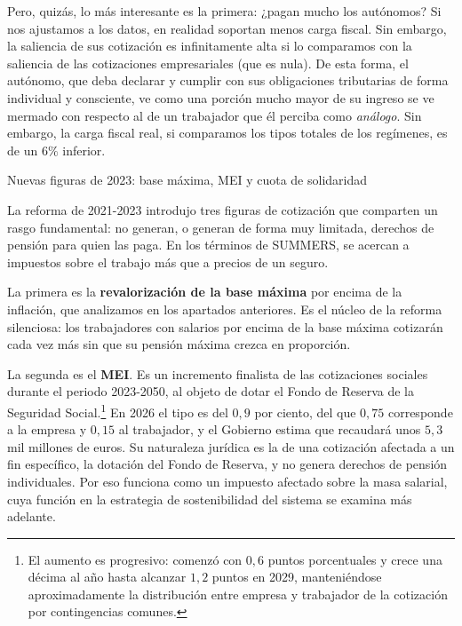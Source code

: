 \documentclass[10pt,a4paper]{article}
\begin{document}
Pero, quizás, lo más interesante es la primera: ¿pagan mucho los autónomos? Si nos ajustamos a los datos, en realidad soportan menos carga fiscal. Sin embargo, la saliencia de sus cotización es infinitamente alta si lo comparamos con la saliencia de las cotizaciones empresariales (que es nula). De esta forma, el autónomo, que deba declarar y cumplir con sus obligaciones tributarias de forma individual y consciente, ve como una porción mucho mayor de su ingreso se ve mermado con respecto al de un trabajador que él perciba como \textit{análogo}. Sin embargo, la carga fiscal real, si comparamos los tipos totales de los regímenes, es de un $6\%$ inferior.

Nuevas figuras de 2023: base máxima, MEI y cuota de solidaridad

La reforma de 2021-2023 introdujo tres figuras de cotización que comparten un rasgo fundamental: no generan, o generan de forma muy limitada, derechos de pensión para quien las paga. En los términos de SUMMERS, se acercan a impuestos sobre el trabajo más que a precios de un seguro.

La primera es la \textbf{revalorización de la base máxima} por encima de la inflación, que analizamos en los apartados anteriores. Es el núcleo de la reforma silenciosa: los trabajadores con salarios por encima de la base máxima cotizarán cada vez más sin que su pensión máxima crezca en proporción.

La segunda es el \textbf{MEI}. Es un incremento finalista de las cotizaciones sociales durante el periodo 2023-2050, al objeto de dotar el Fondo de Reserva de la Seguridad Social.\footnote{%
    El aumento es progresivo: comenzó con $0,6$ puntos porcentuales y crece una décima al año hasta alcanzar $1,2$ puntos en 2029, manteniéndose aproximadamente la distribución entre empresa y trabajador de la cotización por contingencias comunes.
} En 2026 el tipo es del $0,9$ por ciento, del que $0,75$ corresponde a la empresa y $0,15$ al trabajador, y el Gobierno estima que recaudará unos $5,3$ mil millones de euros. Su naturaleza jurídica es la de una cotización afectada a un fin específico, la dotación del Fondo de Reserva, y no genera derechos de pensión individuales. Por eso funciona como un impuesto afectado sobre la masa salarial, cuya función en la estrategia de sostenibilidad del sistema se examina más adelante.
\end{document}
